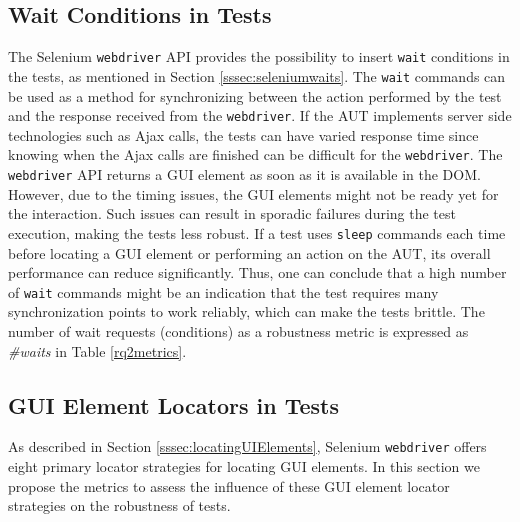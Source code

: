\subsection{Wait Conditions in Tests}
\label{selenium-waits-metric}
The Selenium \texttt{webdriver} API provides the possibility to insert \texttt{wait} conditions in the tests, as mentioned in Section \ref{sssec:seleniumwaits}. The \texttt{wait} commands can be used as a method for synchronizing between the action performed by the test and the response received from the \texttt{webdriver}. If the AUT implements server side technologies such as Ajax calls, the tests can have varied response time since knowing when the Ajax calls are finished can be difficult for the \texttt{webdriver}. The \texttt{webdriver} API returns a GUI element as soon as it is available in the DOM. However, due to the timing issues, the GUI elements might not be ready yet for the interaction. Such issues can result in sporadic failures during the test execution, making the tests less robust. If a test uses \texttt{sleep} commands each time before locating a GUI element or performing an action on the AUT, its overall performance can reduce significantly. Thus, one can conclude that a high number of \texttt{wait} commands might be an indication that the test requires many synchronization points to work reliably, which can make the tests brittle. The number of wait requests (conditions) as a robustness metric is expressed as \textit{\#waits} in Table \ref{rq2metrics}.

\subsection{GUI Element Locators in Tests}
\label{sssec:GUIelementlocators}
As described in Section \ref{sssec:locatingUIElements}, Selenium \texttt{webdriver} offers eight primary locator strategies for locating GUI elements. In this section we propose the metrics to assess the influence of these GUI element locator strategies on the robustness of tests.

